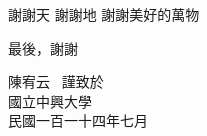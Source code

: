 \begin{acknowledgement}%

謝謝天 謝謝地 謝謝美好的萬物

最後，謝謝 

\vspace{5mm}
\vspace{5mm}
\vspace{5mm}
\vspace{5mm}
\vspace{5mm}
\vspace{5mm}
\vspace{5mm}
\begin{flushright}
陳宥云 \  謹致於\\
國立中興大學\\
民國一百一十四年七月
\end{flushright}
\end{acknowledgement}